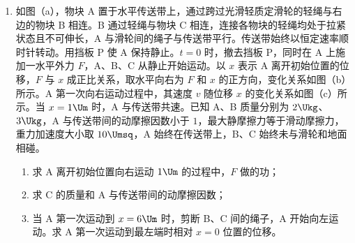\documentclass[\gkver]{gaokaozhenti}
\begin{document}
\begin{enumerate}
{经分析，符合题意的两种情况为：

情况一：每次在磁场中速度方向偏转 $120^\circ$，则 $2t_0\cdot\frac{qB_1}{m}=\frac{2\pi}{3}$，解得 $B_1=\frac{\pi m}{3qt_0}=\frac{\sqrt3\pi E_0}{9v_0}$。

情况二：每次在磁场中速度方向偏转 $180^\circ$，则 $2t_0\cdot\frac{qB_1}{m}=\pi$，解得 $B_1=\frac{\pi m}{2qt_0}=\frac{\sqrt3\pi E_0}{6v_0}$。

故幅值应调为 $\frac{\sqrt3\pi E_0}{9v_0}$ 或 $\frac{\sqrt3\pi E_0}{6v_0}$。
}

\item
如图（a），物块 A 置于水平传送带上，通过跨过光滑轻质定滑轮的轻绳与右边的物块 B 相连。B 通过轻绳与物块 C 相连，连接各物块的轻绳均处于拉紧状态且不可伸长，A 与滑轮间的绳子与传送带平行。传送带始终以恒定速率顺时针转动。用挡板 P 使 A 保持静止。$t=0$ 时，撤去挡板 P，同时在 A 上施加一水平外力 $F$，A、B、C 从静止开始运动。以 $x$ 表示 A 离开初始位置的位移，$F$ 与 $x$ 成正比关系，取水平向右为 $F$ 和 $x$ 的正方向，变化关系如图（b）所示。A 第一次向右运动过程中，其速度 $v$ 随位移 $x$ 的变化关系如图（c）所示。当 $x=1\Um$ 时，A 与传送带共速。已知 A、B 质量分别为 $2\Ukg$、$3\Ukg$，A 与传送带间的动摩擦因数小于 $1$，最大静摩擦力等于滑动摩擦力，重力加速度大小取 $10\Umsq$，A 始终在传送带上，B、C 始终未与滑轮和地面相碰。
\begin{enumerate}
	\item
	求 A 离开初始位置向右运动 $1\Um$ 的过程中，$F$ 做的功；
	\item
	求 C 的质量和 A 与传送带间的动摩擦因数；
	\item
	当 A 第一次运动到 $x=6\Um$ 时，剪断 B、C 间的绳子，A 开始向左运动。求 A 第一次运动到最左端时相对 $x=0$ 位置的位移。
\end{enumerate}
\end{enumerate}
\end{document}
